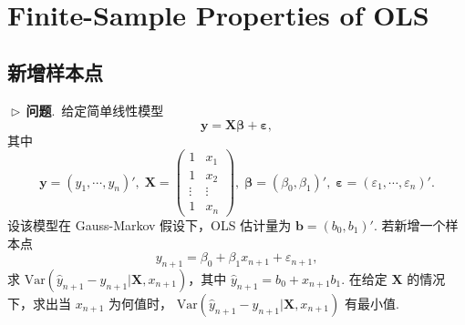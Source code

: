 \documentclass{article}
\newcommand{\Var}{\mathrm{Var}}
\newcommand{\y}{\mathbf{y}}
\newcommand{\X}{\mathbf{X}}
\newcommand{\0}{\mathbf{0}}
\newcommand{\vbe}{\bm{\beta}}
\newcommand{\ve}{\bm{\varepsilon}}
\newcommand{\vb}{\mathbf{b}}
\newcommand{\pro}{\noindent$\vartriangleright\,$\textbf{问题}.\ }
\begin{document}
\\ 

\section{Finite-Sample Properties of OLS}

\subsection{新增样本点}
\pro 给定简单线性模型
\[
\y = \X \vbe +\ve,
\]
其中 
\[
\y=(y_1,\cdots,y_n)',\;\X=
\begin{pmatrix}
1& x_1\\
1& x_2\\
\vdots&\vdots\\
1& x_n
\end{pmatrix},\;
\vbe=(\beta_0,\beta_1)',\;
\ve=(\varepsilon_1,\cdots,\varepsilon_n)'.
\]
设该模型在 Gauss-Markov 假设下，OLS 估计量为 $\vb=(b_0,b_1)'$. 若新增一个样本点
\[
y_{n+1}=\beta_0+\beta_1x_{n+1}+\varepsilon_{n+1},
\]
求 $\Var(\hat{y}_{n+1}-y_{n+1}|\X,x_{n+1})$，其中 $\hat{y}_{n+1}=b_0+x_{n+1}b_1$. 在给定 $\X$ 的情况下，求出当 $x_{n+1}$ 为何值时， $\Var(\hat{y}_{n+1}-y_{n+1}|\X,x_{n+1})$ 有最小值.\\
\end{document}
